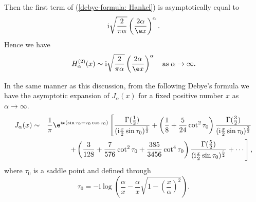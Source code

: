 \documentclass[12pt]{report}
\begin{document}
Then the first term of (\ref{debye-formula: Hankel}) is asymptotically equal to
\begin{displaymath}
\mathrm{i}\sqrt{\frac{2}{\pi\alpha}}\left(\frac{2\alpha}{\e x}\right)^\alpha.
\end{displaymath}
Hence we have
\begin{displaymath}
H^{(2)}_\alpha(x) \sim \mathrm{i}\sqrt{\frac{2}{\pi\alpha}}\left(\frac{2\alpha}{\e x}\right)^\alpha \quad {\rm as}\;\alpha\rightarrow\infty.
\end{displaymath}

In the same manner as this discussion, from the following Debye's formula\cite{Debye} we have the asymptotic expansion of $J_\alpha(x)$ for a fixed positive number $x$ as $\alpha\rightarrow\infty$.
\begin{eqnarray}
J_{\alpha}(x)&\sim&\frac{\mathrm{1}}{\pi}\e^{\mathrm{i}x(\sin\tau_0-\tau_0\cos\tau_0)}\left[\frac{\Gamma(\frac{1}{2})}{(\mathrm{i}\frac{x}{2}\sin\tau_0)^{\frac{1}{2}}}+\left(\frac{1}{8}+\frac{5}{24}\cot^2\tau_0\right)\frac{\Gamma(\frac{3}{2})}{(\mathrm{i}\frac{x}{2}\sin\tau_0)^{\frac{3}{2}}}\right. \nonumber\\
&&\left.+\left(\frac{3}{128}+\frac{7}{576}\cot^2\tau_0+\frac{385}{3456}\cot^4\tau_0\right)\frac{\Gamma(\frac{5}{2})}{(\mathrm{i}\frac{x}{2}\sin\tau_0)^{\frac{5}{2}}}+\cdots\right],
\label{debye-formula: Bessel}
\end{eqnarray}
where $\tau_0$ is a saddle point and defined through
\begin{equation}
\tau_0=-\mathrm{i}\log\left(\frac{\alpha}{x}-\frac{\alpha}{x}\sqrt{1-\left(\frac{x}{\alpha}\right)^2}\right).
\label{tau_0-2}
\end{equation}

\cleardoublepage
{}

\end{document}
